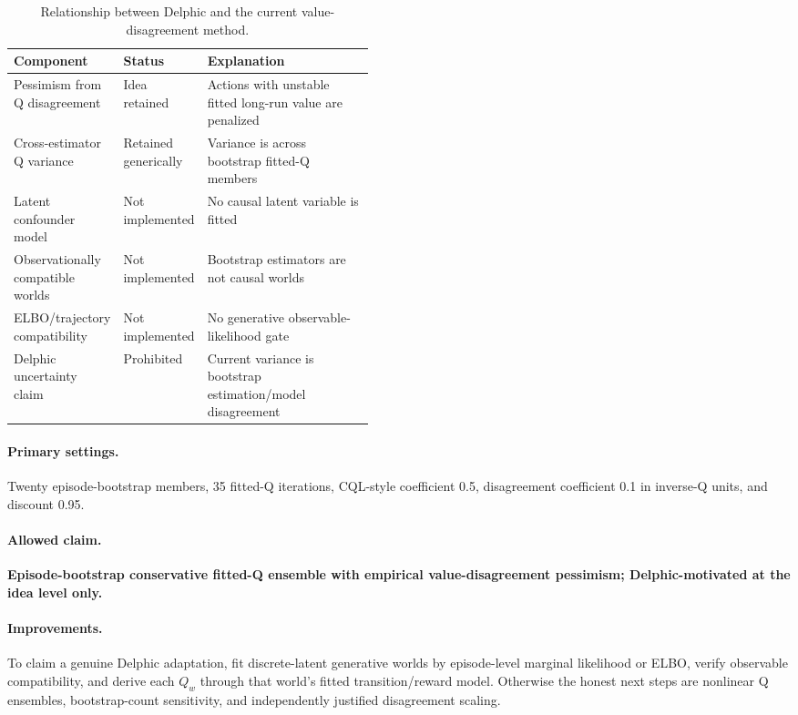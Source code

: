 \documentclass[11pt,a4paper]{article}
\newcommand{\adaptation}[1]{\textcolor{adaptgreen}{\textbf{#1}}}
\begin{document}
\begin{table}[ht]
\centering
\caption{Relationship between Delphic and the current value-disagreement method.}
\begin{tabularx}{\linewidth}{P{0.28\linewidth}P{0.18\linewidth}Y}
\toprule
Component & Status & Explanation \\
\midrule
Pessimism from Q disagreement & Idea retained & Actions with unstable fitted long-run value are penalized \\
Cross-estimator Q variance & Retained generically & Variance is across bootstrap fitted-Q members \\
Latent confounder model & Not implemented & No causal latent variable is fitted \\
Observationally compatible worlds & Not implemented & Bootstrap estimators are not causal worlds \\
ELBO/trajectory compatibility & Not implemented & No generative observable-likelihood gate \\
Delphic uncertainty claim & Prohibited & Current variance is bootstrap estimation/model disagreement \\
\bottomrule
\end{tabularx}
\end{table}

\paragraph{Primary settings.}
Twenty episode-bootstrap members, 35 fitted-Q iterations, CQL-style coefficient 0.5,
disagreement coefficient 0.1 in inverse-Q units, and discount 0.95.

\paragraph{Allowed claim.}
\adaptation{Episode-bootstrap conservative fitted-Q ensemble with empirical value-disagreement
pessimism; Delphic-motivated at the idea level only.}

\paragraph{Improvements.}
To claim a genuine Delphic adaptation, fit discrete-latent generative worlds by episode-level
marginal likelihood or ELBO, verify observable compatibility, and derive each $Q_w$ through that
world's fitted transition/reward model. Otherwise the honest next steps are nonlinear Q ensembles,
bootstrap-count sensitivity, and independently justified disagreement scaling.
\end{document}
